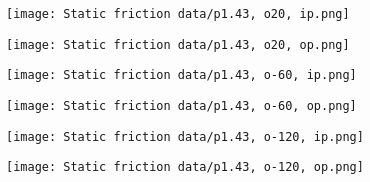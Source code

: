 \documentclass[12pt]{article}
\begin{document}
\begin{figure}[!h]
    \centering
    \begin{minipage}{0.49\textwidth}       
         \texttt{[image: Static friction data/p1.43, o20, ip.png]}
    \end{minipage}
    \begin{minipage}{0.49\textwidth}       
         \texttt{[image: Static friction data/p1.43, o20, op.png]}
    \end{minipage}

\end{figure}
\begin{figure}[!h]
    \centering
    \begin{minipage}{0.49\textwidth}       
         \texttt{[image: Static friction data/p1.43, o-60, ip.png]}
    \end{minipage}
    \begin{minipage}{0.49\textwidth}       
         \texttt{[image: Static friction data/p1.43, o-60, op.png]}
    \end{minipage}

\end{figure}
\begin{figure}[!h]
    \centering
    \begin{minipage}{0.49\textwidth}       
         \texttt{[image: Static friction data/p1.43, o-120, ip.png]}
    \end{minipage}
    \begin{minipage}{0.49\textwidth}       
         \texttt{[image: Static friction data/p1.43, o-120, op.png]}
    \end{minipage}

\end{figure}
\end{document}
